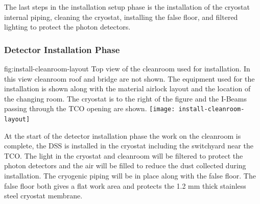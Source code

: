The last steps in the installation setup phase is the installation of the cryostat internal piping, cleaning the cryostat, installing the false floor, and filtered lighting to protect the photon detectors. 


\subsubsection{Detector Installation Phase}

\begin{dunefigure}{fig:install-cleanroom-layout}
  {Top view of the cleanroom used for installation. In this view cleanroom roof and bridge are not shown. The equipment used for the installation is shown along with the material airlock layout and the location of the changing room. The cryostat is to the right of the figure and the I-Beams passing through the TCO opening are shown.}
 \texttt{[image: install-cleanroom-layout]}
\end{dunefigure}

At the start of the detector installation phase the work on the cleanroom is complete, the DSS is installed in the cryostat including the switchyard near the TCO. 
The light in the cryostat and cleanroom will be filtered to protect the photon detectors and the air will be filled to reduce the dust collected during installation. 
The cryogenic piping will be in place along with the false floor. 
The false floor both gives a flat work area and protects the 1.2 \si{mm} thick stainless steel cryostat membrane. 
          

